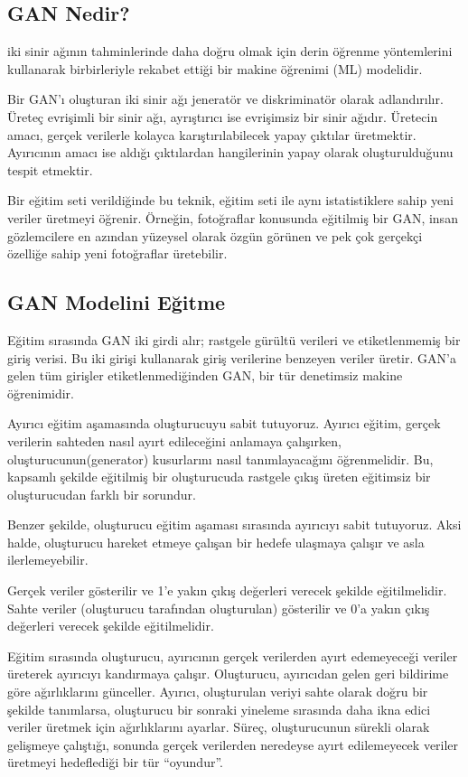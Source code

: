 \documentclass[12pt, a4paper]{article}
\begin{document}
	\subsection{GAN Nedir?}
	
	iki sinir ağının tahminlerinde daha doğru olmak için derin öğrenme yöntemlerini kullanarak birbirleriyle rekabet ettiği bir makine öğrenimi (ML) modelidir\cite{What-2024-05-31}. 
	
	Bir GAN'ı oluşturan iki sinir ağı jeneratör ve diskriminatör olarak adlandırılır. Üreteç evrişimli bir sinir ağı, ayrıştırıcı ise evrişimsiz bir sinir ağıdır. Üretecin amacı, gerçek verilerle kolayca karıştırılabilecek yapay çıktılar üretmektir. Ayırıcının amacı ise aldığı çıktılardan hangilerinin yapay olarak oluşturulduğunu tespit etmektir.
	
	Bir eğitim seti verildiğinde bu teknik, eğitim seti ile aynı istatistiklere sahip yeni veriler üretmeyi öğrenir. Örneğin, fotoğraflar konusunda eğitilmiş bir GAN, insan gözlemcilere en azından yüzeysel olarak özgün görünen ve pek çok gerçekçi özelliğe sahip yeni fotoğraflar üretebilir\cite{Generative-2024-05-31}. 
	
	\subsection{GAN Modelini Eğitme}
	Eğitim sırasında GAN iki girdi alır; rastgele gürültü verileri ve etiketlenmemiş bir giriş verisi. Bu iki girişi kullanarak giriş verilerine benzeyen veriler üretir. GAN'a gelen tüm girişler etiketlenmediğinden GAN, bir tür denetimsiz makine öğrenimidir.
	
	Ayırıcı eğitim aşamasında oluşturucuyu sabit tutuyoruz. Ayırıcı eğitim, gerçek verilerin sahteden nasıl ayırt edileceğini anlamaya çalışırken, oluşturucunun(generator) kusurlarını nasıl tanımlayacağını öğrenmelidir. Bu, kapsamlı şekilde eğitilmiş bir oluşturucuda rastgele çıkış üreten eğitimsiz bir oluşturucudan farklı bir sorundur.
	
	Benzer şekilde, oluşturucu eğitim aşaması sırasında ayırıcıyı sabit tutuyoruz. Aksi halde, oluşturucu hareket etmeye çalışan bir hedefe ulaşmaya çalışır ve asla ilerlemeyebilir.
	
	Gerçek veriler gösterilir ve 1'e yakın çıkış değerleri verecek şekilde eğitilmelidir. Sahte veriler (oluşturucu tarafından oluşturulan) gösterilir ve 0'a yakın çıkış değerleri verecek şekilde eğitilmelidir.
	
	Eğitim sırasında oluşturucu, ayırıcının gerçek verilerden ayırt edemeyeceği veriler üreterek ayırıcıyı kandırmaya çalışır.
	Oluşturucu, ayırıcıdan gelen geri bildirime göre ağırlıklarını günceller. Ayırıcı, oluşturulan veriyi sahte olarak doğru bir şekilde tanımlarsa, oluşturucu bir sonraki yineleme sırasında daha ikna edici veriler üretmek için ağırlıklarını ayarlar.
	Süreç, oluşturucunun sürekli olarak gelişmeye çalıştığı, sonunda gerçek verilerden neredeyse ayırt edilemeyecek veriler üretmeyi hedeflediği bir tür “oyundur”\cite{Multiverse}.
	
\end{document}
